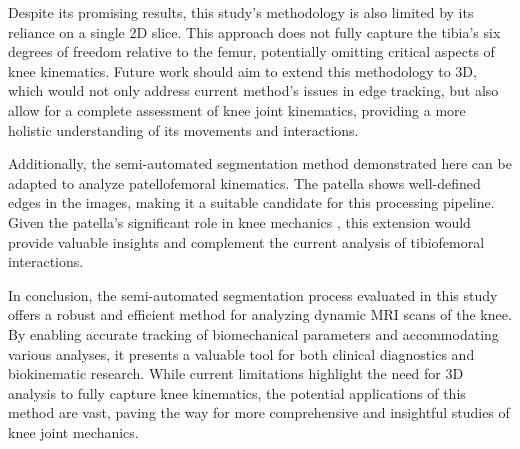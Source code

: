 \documentclass{micro-econ-thesis}
\begin{document}
Despite its promising results, this study's methodology is also limited by its reliance on a single 2D slice. This approach does not fully capture the tibia's six degrees of freedom relative to the femur, potentially omitting critical aspects of knee kinematics. Future work should aim to extend this methodology to 3D, which would not only address current method's issues in edge tracking, but also allow for a complete assessment of knee joint kinematics, providing a more holistic understanding of its movements and interactions.

Additionally, the semi-automated segmentation method demonstrated here can be adapted to analyze patellofemoral kinematics. The patella shows well-defined edges in the images, making it a suitable candidate for this processing pipeline. Given the patella's significant role in knee mechanics \parencite{powers_evidence-based_2017}, this extension would provide valuable insights and complement the current analysis of tibiofemoral interactions.

In conclusion, the semi-automated segmentation process evaluated in this study offers a robust and efficient method for analyzing dynamic MRI scans of the knee. By enabling accurate tracking of biomechanical parameters and accommodating various analyses, it presents a valuable tool for both clinical diagnostics and biokinematic research. While current limitations highlight the need for 3D analysis to fully capture knee kinematics, the potential applications of this method are vast, paving the way for more comprehensive and insightful studies of knee joint mechanics.
\cleardoublepage
{}
{} %
\printbibliography

%
%
%
%



\end{document}
